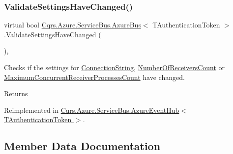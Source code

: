 \subsubsection{\texorpdfstring{Validate\+Settings\+Have\+Changed()}{ValidateSettingsHaveChanged()}}
{\footnotesize\ttfamily virtual bool \hyperlink{classCqrs_1_1Azure_1_1ServiceBus_1_1AzureBus}{Cqrs.\+Azure.\+Service\+Bus.\+Azure\+Bus}$<$ T\+Authentication\+Token $>$.Validate\+Settings\+Have\+Changed (\begin{DoxyParamCaption}{ }\end{DoxyParamCaption})\hspace{0.3cm}{\ttfamily [protected]}, {\ttfamily [virtual]}}



Checks if the settings for \hyperlink{classCqrs_1_1Azure_1_1ServiceBus_1_1AzureBus_aaccdbc8cd25d3ae4f1a2801d2ad02a96_aaccdbc8cd25d3ae4f1a2801d2ad02a96}{Connection\+String}, \hyperlink{classCqrs_1_1Azure_1_1ServiceBus_1_1AzureBus_a65ca2b61bf8f2dba9d0e0f54ec64c2b9_a65ca2b61bf8f2dba9d0e0f54ec64c2b9}{Number\+Of\+Receivers\+Count} or \hyperlink{classCqrs_1_1Azure_1_1ServiceBus_1_1AzureBus_a6b517888d91c6a5b026cb5857e75a04f_a6b517888d91c6a5b026cb5857e75a04f}{Maximum\+Concurrent\+Receiver\+Processes\+Count} have changed. 

\begin{DoxyReturn}{Returns}

\end{DoxyReturn}


Reimplemented in \hyperlink{classCqrs_1_1Azure_1_1ServiceBus_1_1AzureEventHub_afe8d6f93f97ab5658b81903af555632c_afe8d6f93f97ab5658b81903af555632c}{Cqrs.\+Azure.\+Service\+Bus.\+Azure\+Event\+Hub$<$ T\+Authentication\+Token $>$}.



\subsection{Member Data Documentation}
\mbox{\label{classCqrs_1_1Azure_1_1ServiceBus_1_1AzureBus_a12c3d07b7ad1836e85a449e6adc8b5df_a12c3d07b7ad1836e85a449e6adc8b5df}} 
